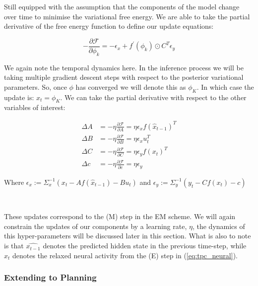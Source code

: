 \documentclass{article}
\newcommand{\refp}[1]{(\ref{#1})}
\begin{document}
Still equipped with the assumption that the components of the model change over time to minimise the variational free energy. We are able to take the partial derivative of the free energy function to define our update equations:

\begin{equation}\label{eq:tpc_neural}
	-\frac{\partial \mathcal{F}}{\partial\phi_k}=-\epsilon_x+f^{\prime}\left(\phi_k\right) \odot C^T \epsilon_y
\end{equation}

We again note the temporal dynamics here. In the inference process we will be taking multiple gradient descent steps with respect to the posterior variational parameters. So, once $\phi$ has converged we will denote this as $\phi_K$. In which case the update is: $x_t = \phi_K$. We can take the partial derivative with respect to the other variables of interest:

\begin{equation}
    \begin{aligned}
        \Delta A &= -\eta \frac{\partial \mathcal{F}}{\partial A} = \eta \epsilon_x f\left(\hat{x}_{t-1}\right)^T \\
        \Delta B &= -\eta \frac{\partial \mathcal{F}}{\partial B} = \eta \epsilon_x u_t^T \\
        \Delta C &= -\eta \frac{\partial \mathcal{F}}{\partial C} = \eta \epsilon_y f\left(x_t\right)^T \\
        \Delta c &= -\eta \frac{\partial \mathcal{F}}{\partial c} = \eta \epsilon_y
    \end{aligned}
\end{equation}

Where $\epsilon_x := \Sigma_x^{-1}(x_t - A f(\hat{x}_{t-1}) - Bu_t)$ and $\epsilon_y := \Sigma_y^{-1}(y_t - C f(x_t) - c)$

\

These updates correspond to the (M) step in the EM scheme. We will again constrain the updates of our components by a learning rate, $\eta$, the dynamics of this hyper-parameters will be discussed later in this section. What is also to note is that $\hat{x_{t-1}}$ denotes the predicted hidden state in the previous time-step, while $x_t$ denotes the relaxed neural activity from the (E) step in \refp{eq:tpc_neural}. 

\subsubsection{Extending to Planning}
\end{document}
